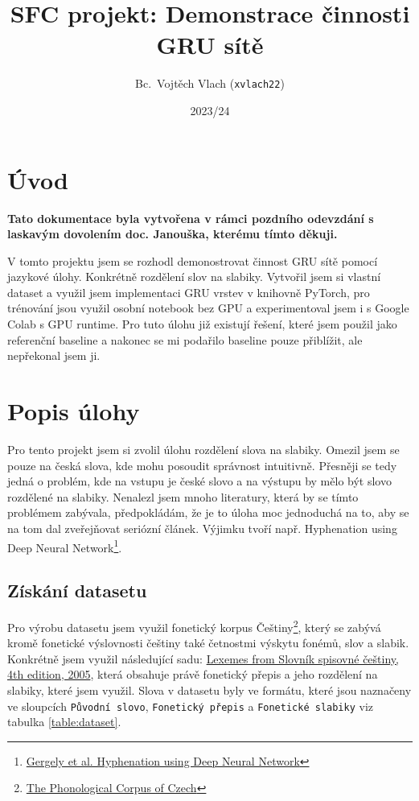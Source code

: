 \documentclass[a4paper]{article}
\title{SFC projekt: Demonstrace činnosti GRU sítě}
\author{Bc.\ Vojtěch Vlach (\texttt{xvlach22})}
\date{2023/24}
\theoremstyle{definition}
\begin{document}
\maketitle

\section{Úvod}
\textbf{Tato dokumentace byla vytvořena v rámci pozdního odevzdání s laskavým dovolením doc. Janouška, kterému tímto děkuji.}

V tomto projektu jsem se rozhodl demonostrovat činnost GRU sítě pomocí jazykové úlohy. Konkrétně rozdělení slov na slabiky. Vytvořil jsem si vlastní dataset a využil jsem implementaci GRU vrstev v  knihovně PyTorch, pro trénování jsou využil osobní notebook bez GPU a experimentoval jsem i s Google Colab s GPU runtime. Pro tuto úlohu již existují řešení, které jsem použil jako referenční baseline a nakonec se mi podařilo baseline pouze přiblížit, ale nepřekonal jsem ji.

\section{Popis úlohy}

Pro tento projekt jsem si zvolil úlohu rozdělení slova na slabiky. Omezil jsem se pouze na česká slova, kde mohu posoudit správnost intuitivně. Přesněji se tedy jedná o problém, kde na vstupu je české slovo a na výstupu by mělo být slovo rozdělené na slabiky. Nenalezl jsem mnoho literatury, která by se tímto problémem zabývala, předpokládám, že je to úloha moc jednoduchá na to, aby se na tom dal zveřejňovat seriózní článek. Výjimku tvoří např. Hyphenation using Deep Neural Network\footnote{\href{https://negedng.github.io/files/2018-Hyphenation.pdf}{Gergely et al. Hyphenation using Deep Neural Network}}.

\subsection{Získání datasetu}

Pro výrobu datasetu jsem využil fonetický korpus Češtiny\footnote{\href{https://ujc.avcr.cz/phword}{The Phonological Corpus of Czech}}, který se zabývá kromě fonetické výslovnosti češtiny také četnostmi výskytu fonémů, slov a slabik. Konkrétně jsem využil následující sadu: \href{http://www.ujc.cas.cz/phword/ssc_29-06-16.zip}{Lexemes from Slovník spisovné češtiny, 4th edition, 2005}, která obsahuje právě fonetický přepis a jeho rozdělení na slabiky, které jsem využil. Slova v datasetu byly ve formátu, které jsou naznačeny ve sloupcích \texttt{Původní slovo}, \texttt{Fonetický přepis} a \texttt{Fonetické slabiky} viz tabulka \ref{table:dataset}.
\end{document}
